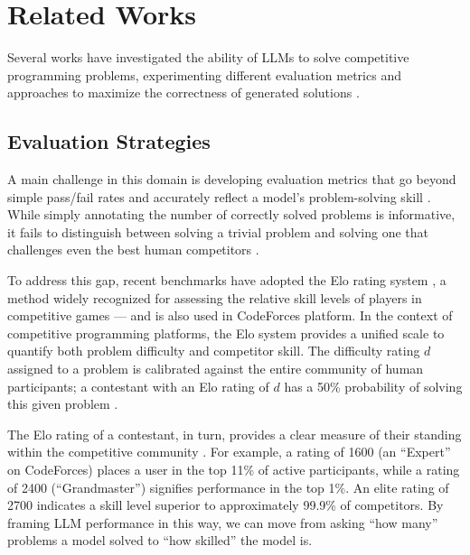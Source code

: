\documentclass[preprint,12pt]{elsarticle}
\begin{document}
\section{Related Works} 
\label{sec:related}

Several works have investigated the ability of LLMs to solve competitive programming problems, experimenting different evaluation metrics and approaches to maximize the correctness of generated solutions \cite{shi2024languagemodelssolveolympiad, quan2025codeelobenchmarkingcompetitionlevelcode, jain2024livecodebenchholisticcontaminationfree, zheng2025livecodebenchproolympiadmedalists, deng2025cpretdatasetbenchmarkmodel, hossain2025llmprosanalyzinglargelanguage, chen2021evaluatinglargelanguagemodels}. 

\subsection{Evaluation Strategies}

A main challenge in this domain is developing evaluation metrics that go beyond simple pass/fail rates and accurately reflect a model's problem-solving skill \cite{quan2025codeelobenchmarkingcompetitionlevelcode}. While simply annotating the number of correctly solved problems is informative, it fails to distinguish between solving a trivial problem and solving one that challenges even the best human competitors \cite{zheng2025livecodebenchproolympiadmedalists}.

To address this gap, recent benchmarks \cite{quan2025codeelobenchmarkingcompetitionlevelcode, openai2025introducing, boubdir2023elouncoveredrobustnessbest} have adopted the Elo rating system \cite{elo1978rating}, a method widely recognized for assessing the relative skill levels of players in competitive games --- and is also used in CodeForces platform. In the context of competitive programming platforms, the Elo system provides a unified scale to quantify both problem difficulty and competitor skill. The difficulty rating $d$ assigned to a problem is calibrated against the entire community of human participants; a contestant with an Elo rating of $d$ has a 50\% probability of solving this given problem \cite{boubdir2023elouncoveredrobustnessbest}.

The Elo rating of a contestant, in turn, provides a clear measure of their standing within the competitive community \cite{zheng2025livecodebenchproolympiadmedalists}. For example, a rating of 1600 (an ``Expert'' on CodeForces) places a user in the top 11\% of active participants, while a rating of 2400 (``Grandmaster'') signifies performance in the top 1\%. An elite rating of 2700 indicates a skill level superior to approximately 99.9\% of competitors. By framing LLM performance in this way, we can move from asking ``how many'' problems a model solved to ``how skilled'' the model is.
\end{document}
